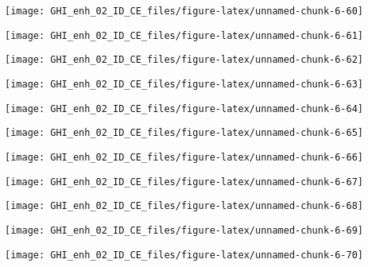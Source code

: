 \documentclass[
  10pt,
  a4paper,oneside]{article}
\begin{document}
\begin{center}\texttt{[image: GHI\_enh\_02\_ID\_CE\_files/figure-latex/unnamed-chunk-6-60]} \end{center}

\begin{center}\texttt{[image: GHI\_enh\_02\_ID\_CE\_files/figure-latex/unnamed-chunk-6-61]} \end{center}

\begin{center}\texttt{[image: GHI\_enh\_02\_ID\_CE\_files/figure-latex/unnamed-chunk-6-62]} \end{center}

\begin{center}\texttt{[image: GHI\_enh\_02\_ID\_CE\_files/figure-latex/unnamed-chunk-6-63]} \end{center}

\begin{center}\texttt{[image: GHI\_enh\_02\_ID\_CE\_files/figure-latex/unnamed-chunk-6-64]} \end{center}

\begin{center}\texttt{[image: GHI\_enh\_02\_ID\_CE\_files/figure-latex/unnamed-chunk-6-65]} \end{center}

\begin{center}\texttt{[image: GHI\_enh\_02\_ID\_CE\_files/figure-latex/unnamed-chunk-6-66]} \end{center}

\begin{center}\texttt{[image: GHI\_enh\_02\_ID\_CE\_files/figure-latex/unnamed-chunk-6-67]} \end{center}

\begin{center}\texttt{[image: GHI\_enh\_02\_ID\_CE\_files/figure-latex/unnamed-chunk-6-68]} \end{center}

\begin{center}\texttt{[image: GHI\_enh\_02\_ID\_CE\_files/figure-latex/unnamed-chunk-6-69]} \end{center}

\begin{center}\texttt{[image: GHI\_enh\_02\_ID\_CE\_files/figure-latex/unnamed-chunk-6-70]} \end{center}
\end{document}
